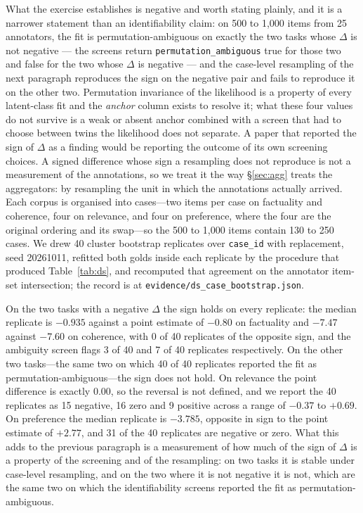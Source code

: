 \documentclass{article}
\newcommand{\ids}[1]{\texttt{\small #1}} %
\begin{document}
What the exercise establishes is negative and worth stating plainly, and it is a narrower statement than an identifiability claim: on 500 to 1,000 items from 25 annotators, the fit is permutation-ambiguous on exactly the two tasks whose $\Delta$ is not negative --- the screens return \texttt{permutation\_ambiguous} true for those two and false for the two whose $\Delta$ is negative --- and the case-level resampling of the next paragraph reproduces the sign on the negative pair and fails to reproduce it on the other two. Permutation invariance of the likelihood is a property of every latent-class fit and the \emph{anchor} column exists to resolve it; what these four values do not survive is a weak or absent anchor combined with a screen that had to choose between twins the likelihood does not separate. A paper that reported the sign of $\Delta$ as a finding would be reporting the outcome of its own screening choices.
A signed difference whose sign a resampling does not reproduce is not a measurement of the annotations, so we treat it the way \S\ref{sec:agg} treats the aggregators: by resampling the unit in which the annotations actually arrived. Each corpus is organised into cases---two items per case on factuality and coherence, four on relevance, and four on preference, where the four are the original ordering and its swap---so the 500 to 1,000 items contain 130 to 250 cases. We drew 40 cluster bootstrap replicates over \ids{case\_id} with replacement, seed 20261011, refitted both golds inside each replicate by the procedure that produced Table~\ref{tab:ds}, and recomputed that agreement on the annotator item-set intersection; the record is at \ids{evidence/ds\_case\_bootstrap.json}.

On the two tasks with a negative $\Delta$ the sign holds on every replicate: the median replicate is $-0.935$ against a point estimate of $-0.80$ on factuality and $-7.47$ against $-7.60$ on coherence, with 0 of 40 replicates of the opposite sign, and the ambiguity screen flags 3 of 40 and 7 of 40 replicates respectively. On the other two tasks---the same two on which 40 of 40 replicates reported the fit as permutation-ambiguous---the sign does not hold. On relevance the point difference is exactly $0.00$, so the reversal is not defined, and we report the 40 replicates as 15 negative, 16 zero and 9 positive across a range of $-0.37$ to $+0.69$. On preference the median replicate is $-3.785$, opposite in sign to the point estimate of $+2.77$, and 31 of the 40 replicates are negative or zero. What this adds to the previous paragraph is a measurement of how much of the sign of $\Delta$ is a property of the screening and of the resampling: on two tasks it is stable under case-level resampling, and on the two where it is not negative it is not, which are the same two on which the identifiability screens reported the fit as permutation-ambiguous.
\end{document}
